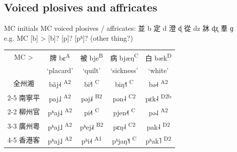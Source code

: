 \documentclass{beamer}
\begin{document}
\subsection{Voiced plosives and affricates}
\begin{frame}[fragile]{MC initials}
MC voiced plosives / affricates: 並 b 定 d 澄 ɖ 從 dz 牀 ɖʐ 羣 ɡ\\
\smallskip
e.g. MC [b] > [b]? [p]? [pʰ]? {\scriptsize (other thing?)}\\

\begin{table}
    \centering
    \renewcommand{\arraystretch}{1.25}
    \begin{tabular}{c|c c c c}
         \hline
         MC > & 牌 bɛ\textsuperscript{A} & 被 bje\textsuperscript{B} & 病 bjæŋ\textsuperscript{C} & 白 bæk\textsuperscript{D}\\
          & \enquote*{\footnotesize placard} & \enquote*{\footnotesize quilt} & \enquote*{\footnotesize sickness} & \enquote*{\footnotesize white}\\ \hline
         全州湘 & bãj˨˧ \textsuperscript{A2} & bi˧˥ \textsuperscript{C} & biŋ˧˥ \textsuperscript{C} & bə˨˧ \textsuperscript{A2}\\ \cline{2-5}
         南寧平 & paj˩ \textsuperscript{A2} & pəj˩˧ \textsuperscript{B2} & pən˨ \textsuperscript{C2} & pɛk˨ \textsuperscript{D2b}\\ \cline{2-2}
         柳州官 & \multicolumn{1}{c|}{pʰaj˨˩ \textsuperscript{A2}} & pi˨˦ \textsuperscript{C} & pjen˨˦ \textsuperscript{C} & pə˨˩ \textsuperscript{A2}\\ \cline{3-3}
         廣州粵 & pʰaj˩ \textsuperscript{A2} & \multicolumn{1}{c|}{pʰej˩˧ \textsuperscript{B2}} & pɛŋ˨ \textsuperscript{C2} & pak˨ \textsuperscript{D2}\\ \cline{4-5}
         香港客 & pʰaj˩ \textsuperscript{A2}& pʰi˨˧ \textsuperscript{A1} & pʰjaŋ˥˧ \textsuperscript{C} & pʰak˥ \textsuperscript{D2}\\ \hline
    \end{tabular}
\end{table}

\end{frame}
\end{document}
